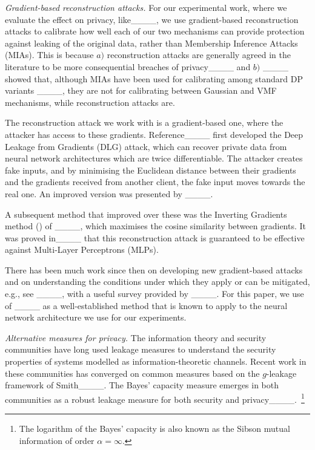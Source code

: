 \emph{Gradient-based reconstruction attacks.} For our experimental work, where we evaluate the effect on privacy, like____, we use gradient-based reconstruction attacks to calibrate how well each of our two mechanisms can provide protection against leaking of the original data, rather than Membership Inference Attacks (MIAs). This is because $a)$ reconstruction attacks are generally agreed in the literature to be more consequential breaches of privacy____ and $b)$ ____ showed that, although MIAs have been used for calibrating among standard DP variants ____, they are not for calibrating between Gaussian and VMF mechanisms, while reconstruction attacks are.

The reconstruction attack we work with is a gradient-based one, where the attacker has access to these gradients.  
    Reference____ first developed the Deep Leakage from Gradients (DLG) attack, which can recover private data from neural network architectures which are twice differentiable. The attacker creates fake inputs, and by minimising the Euclidean distance between their gradients and the gradients received from another client, the fake input moves towards the real one.  An improved version was presented by ____.
    
    A subsequent method that improved over these was the Inverting Gradients method (\IGA) of ____, which maximises the cosine similarity between gradients. It was proved in____  that this reconstruction attack is guaranteed to be effective against Multi-Layer Perceptrons (MLPs). 
    
There has been much work since then on developing new gradient-based attacks and on understanding the conditions under which they apply or can be mitigated, e.g., see ____, with a useful survey provided by ____.
For this paper, we use \IGA of ____ as a well-established method that is known to apply to the neural network architecture we use for our experiments.

\emph{Alternative measures for privacy.} The information theory and security communities have long used leakage measures to understand the security properties of systems modelled as information-theoretic channels. Recent work in these communities has converged on common measures based on the $g$-leakage framework of Smith____. The Bayes' capacity measure emerges in both communities as a robust leakage measure for both security and privacy____.~\footnote{The logarithm of the Bayes' capacity is also known as the Sibson mutual information of order $\alpha = \infty$.} 
 
